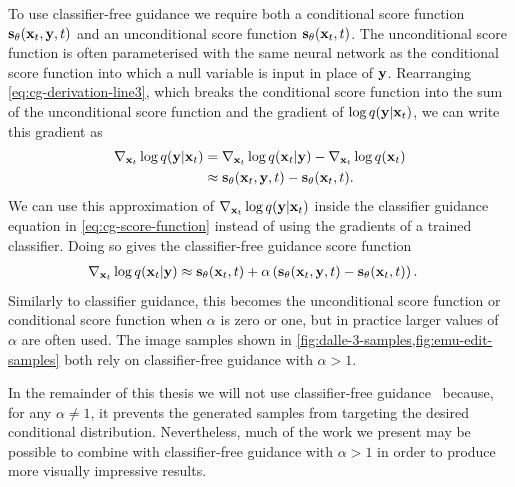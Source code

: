 To use classifier-free guidance we require both a conditional score function ${\mathbf{s}}_\theta({\mathbf{x}}_t, {\mathbf{y}}, t)$ and an unconditional score function ${\mathbf{s}}_\theta({\mathbf{x}}_t, t)$. The unconditional score function is often parameterised with the same neural network as the conditional score function into which a null variable is input in place of ${\mathbf{y}}$. Rearranging \cref{eq:cg-derivation-line3}, which breaks the conditional score function into the sum of the unconditional score function and the gradient of $\log q({\mathbf{y}}|{\mathbf{x}}_t)$, we can write this gradient as
\begin{align}
    \nabla_{{\mathbf{x}}_t} \log q({\mathbf{y}}|{\mathbf{x}}_t) &= \nabla_{{\mathbf{x}}_t} \log q({\mathbf{x}}_t|{\mathbf{y}}) - \nabla_{{\mathbf{x}}_t} \log q({\mathbf{x}}_t) \\
    &\approx {\mathbf{s}}_\theta({\mathbf{x}}_t, {\mathbf{y}}, t) - {\mathbf{s}}_\theta({\mathbf{x}}_t, t).
\end{align}
We can use this approximation of $\nabla_{{\mathbf{x}}_t} \log q({\mathbf{y}}|{\mathbf{x}}_t)$ inside the classifier guidance equation in \cref{eq:cg-score-function} instead of using the gradients of a trained classifier. Doing so gives the classifier-free guidance score function
\begin{align}
    \nabla_{{\mathbf{x}}_t} \log q({\mathbf{x}}_t|{\mathbf{y}}) &\approx {\mathbf{s}}_\theta({\mathbf{x}}_t, t) + \alpha \left( {\mathbf{s}}_\theta({\mathbf{x}}_t, {\mathbf{y}}, t) - {\mathbf{s}}_\theta({\mathbf{x}}_t, t) \right). \label{eq:cfg-score-function}
\end{align}
Similarly to classifier guidance, this becomes the unconditional score function or conditional score function when $\alpha$ is zero or one, but in practice larger values of $\alpha$ are often used. The image samples shown in \cref{fig:dalle-3-samples,fig:emu-edit-samples} both rely on classifier-free guidance with $\alpha > 1$. 

In the remainder of this thesis we will not use classifier-free guidance~\citep{ho2022classifier} because, for any $\alpha \neq 1$, it prevents the generated samples from targeting the desired conditional distribution. Nevertheless, much of the work we present may be possible to combine with classifier-free guidance with $\alpha>1$ in order to produce more visually impressive results.
